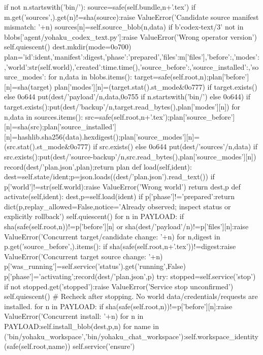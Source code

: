    if not n.startswith('bin/'):
    source=safe(self.bundle,n+'.tex')
    if m.get('sources',{}).get(n)!=sha(source):raise ValueError('Candidate source manifest mismatch: '+n)
    sources[n]=self.source_blob(n,data)
  if b'codex-text/3' not in blobs['agent/yohaku_codex_text.py']:raise ValueError('Wrong operator version')
  self.quiescent()
  dest.mkdir(mode=0o700)
  plan={'id':ident,'manifest':digest,'phase':'prepared','files':m['files'],'before':{},'modes':{},'world':str(self.world),'created':time.time(),'source_before':{},'source_installed':{},'source_modes':{}}
  for n,data in blobs.items():
   target=safe(self.root,n);plan['before'][n]=sha(target)
   plan['modes'][n]=(target.stat().st_mode&0o777) if target.exists() else 0o644
   put(dest/'payload'/n,data,0o755 if n.startswith('bin/') else 0o644)
   if target.exists():put(dest/'backup'/n,target.read_bytes(),plan['modes'][n])
  for n,data in sources.items():
   src=safe(self.root,n+'.tex');plan['source_before'][n]=sha(src);plan['source_installed'][n]=hashlib.sha256(data).hexdigest();plan['source_modes'][n]=(src.stat().st_mode&0o777) if src.exists() else 0o644
   put(dest/'sources'/n,data)
   if src.exists():put(dest/'source-backup'/n,src.read_bytes(),plan['source_modes'][n])
  record(dest/'plan.json',plan);return plan
 def load(self,ident):
  dest=self.state/ident;p=json.loads((dest/'plan.json').read_text())
  if p['world']!=str(self.world):raise ValueError('Wrong world')
  return dest,p
 def activate(self,ident):
  dest,p=self.load(ident)
  if p['phase']!='prepared':return dict(p,replay_allowed=False,notice='Already observed; inspect status or explicitly rollback')
  self.quiescent()
  for n in PAYLOAD:
   if sha(safe(self.root,n))!=p['before'][n] or sha(dest/'payload'/n)!=p['files'][n]:raise ValueError('Concurrent target/candidate change: '+n)
  for n,digest in p.get('source_before',{}).items():
   if sha(safe(self.root,n+'.tex'))!=digest:raise ValueError('Concurrent target source change: '+n)
  p['was_running']=self.service('status').get('running',False)
  p['phase']='activating';record(dest/'plan.json',p)
  try:
   stopped=self.service('stop')
   if not stopped.get('stopped'):raise ValueError('Service stop unconfirmed')
   self.quiescent()
   # Recheck after stopping. No world data/credentials/requests are installed.
   for n in PAYLOAD:
    if sha(safe(self.root,n))!=p['before'][n]:raise ValueError('Concurrent install: '+n)
   for n in PAYLOAD:self.install_blob(dest,p,n)
   for name in ('bin/yohaku_workspace','bin/yohaku_chat_workspace'):self.workspace_identity(safe(self.root,name))
   self.service('ensure')
